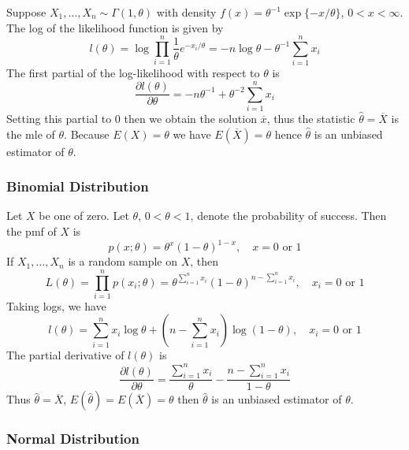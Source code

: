Suppose $X_1,\dots ,X_n\sim\Gamma(1,\theta)$ with density $f(x)=\theta ^{-1}\exp \{ -x/\theta \}$, $0<x<\infty$. The log of the likelihood function is given by
\[
l(\theta)=\log \prod_{i=1}^{n} \frac{1}{\theta} e^{ -x_i/\theta }=-n\log\theta-\theta ^{-1}\sum_{i=1}^{n} x_i
\]
The first partial of the log-likelihood with respect to $\theta$ is
\[
\frac{ \partial l(\theta) }{ \partial \theta } =-n\theta ^{-1}+\theta^{-2}\sum_{i=1}^{n} x_i
\]
Setting this partial to 0 then we obtain the solution $\overline{x}$, thus the statistic $\hat{\theta}=\overline{X}$ is the mle of $\theta$. Because $E(X)=\theta$ we have $E(\overline{X})=\theta$ hence $\hat{\theta}$ is an unbiased estimator of $\theta$.

\subsubsection{Binomial Distribution}

Let $X$ be one of zero. Let $\theta$, $0<\theta<1$, denote the probability of success. Then the pmf of $X$ is
\[
p(x;\theta)=\theta^{x}(1-\theta)^{1-x},\quad x=0\text{ or }1
\]
If $X_1,\dots,X_n$ is a random sample on $X$, then
\[
L(\theta)=\prod_{i=1}^{n} p(x_i;\theta)=\theta^{\sum_{i=1}^{n} x_i}(1-\theta)^{n-\sum_{i=1}^{n}x_i },\quad x_i=0\text{ or }1
\]
Taking logs, we have
\[
l(\theta)=\sum_{i=1}^{n} x_i\log\theta+\left( n-\sum_{i=1}^{n} x_i \right)\log(1-\theta),\quad x_i=0\text{ or }1
\]
The partial derivative of $l(\theta)$ is
\[
\frac{ \partial l(\theta) }{ \partial \theta } =\frac{\sum_{i=1}^{n} x_i}{\theta}-\frac{n-\sum_{i=1}^{n} x_i}{1-\theta}
\]
Thus $\hat{\theta}=\overline{X}$, $E(\widehat{\theta})=E(\overline{X})=\theta$ then $\hat{\theta}$ is an unbiased estimator of $\theta$.

\subsubsection{Normal Distribution}

